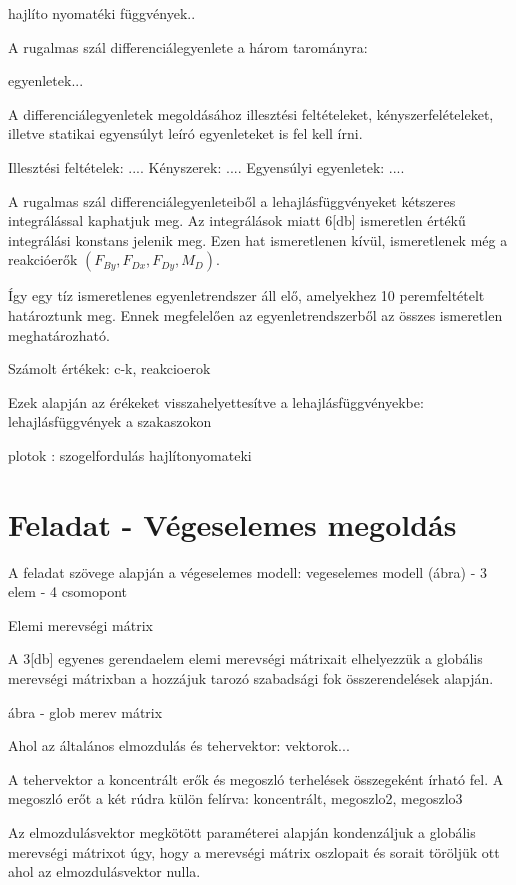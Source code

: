 \documentclass{article}
\begin{document}
		hajlíto nyomatéki függvények..
		
		A rugalmas szál differenciálegyenlete a három tarományra:
		
		egyenletek...
		
		A differenciálegyenletek megoldásához illesztési feltételeket, kényszerfelételeket, illetve statikai egyensúlyt leíró egyenleteket is fel kell írni.
		
		Illesztési feltételek:
		....
		Kényszerek: 
		....
		Egyensúlyi egyenletek:
		....
		
		A rugalmas szál differenciálegyenleteiből a lehajlásfüggvényeket kétszeres integrálással kaphatjuk meg. Az integrálások miatt 6[db] ismeretlen értékű integrálási konstans jelenik meg. Ezen hat ismeretlenen kívül, ismeretlenek még a reakcióerők $(F_{By}, F_{Dx}, F_{Dy}, M_{D})$.
		
		Így egy tíz ismeretlenes egyenletrendszer áll elő, amelyekhez 10 peremfeltételt határoztunk meg. Ennek megfelelően az egyenletrendszerből az összes ismeretlen meghatározható.
		
		Számolt értékek:
		c-k, reakcioerok
		
		Ezek alapján az érékeket visszahelyettesítve a lehajlásfüggvényekbe:
		lehajlásfüggvények a szakaszokon
		
		plotok :
		szogelfordulás
		hajlítonyomateki
	
	
	\section{Feladat - Végeselemes megoldás}
		A feladat szövege alapján a végeselemes modell:
		vegeselemes modell (ábra) - 3 elem - 4 csomopont
		
		Elemi merevségi mátrix
		
		A 3[db] egyenes gerendaelem elemi merevségi mátrixait elhelyezzük a globális merevségi mátrixban a hozzájuk tarozó szabadsági fok összerendelések alapján.
		
		ábra - glob merev mátrix
		
		Ahol az általános elmozdulás és tehervektor:
		vektorok...
		
		A tehervektor a koncentrált erők és megoszló terhelések összegeként írható fel. A megoszló erőt a két rúdra külön felírva:
		koncentrált, megoszlo2, megoszlo3
		
		Az elmozdulásvektor megkötött paraméterei alapján kondenzáljuk a globális merevségi mátrixot úgy, hogy a merevségi mátrix oszlopait és sorait töröljük ott ahol az elmozdulásvektor nulla.
		
\end{document}
